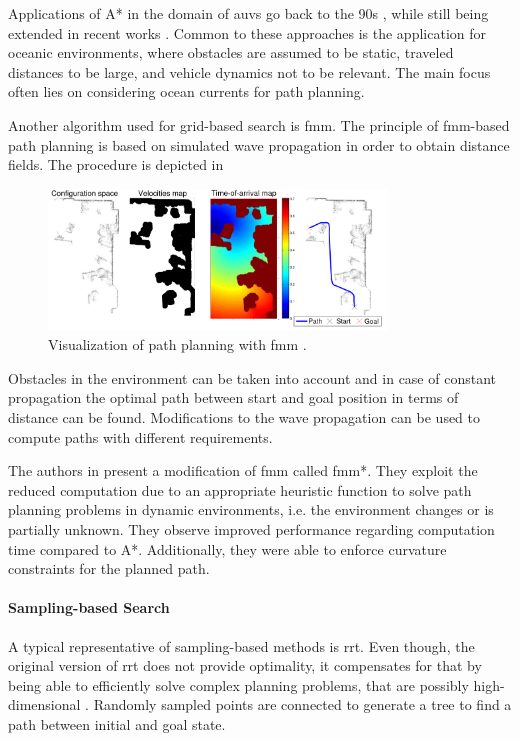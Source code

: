 Applications of A* in the domain of \acp{auv} go back to the 90s \cite{Carroll92}, while still being extended in recent works \cite{zhang20}. Common to these approaches is the application for oceanic environments, where obstacles are assumed to be static, traveled distances to be large, and vehicle dynamics not to be relevant. The main focus often lies on considering ocean currents for path planning.

Another algorithm used for grid-based search is \ac{fmm}. The principle of \acs{fmm}-based path planning is based on simulated wave propagation in order to obtain distance fields. The procedure is depicted in 
\begin{figure}
    \centering
    \includegraphics[width=0.8\textwidth]{images/02/fmm.png}
    \caption{Visualization of path planning with \ac{fmm} \cite{Gomez15}.}
    \label{fig:fmm}
\end{figure}
Obstacles in the environment can be taken into account and in case of constant propagation the optimal path between start and goal position in terms of distance can be found. Modifications to the wave propagation can be used to compute paths with different requirements.

The authors in \cite{Petres09} present a modification of \ac{fmm} called \acs{fmm}*. They exploit the reduced computation due to an appropriate heuristic function to solve path planning problems in dynamic environments, i.e. the environment changes or is partially unknown. They observe improved performance regarding computation time compared to A*. Additionally, they were able to enforce curvature constraints for the planned path.

\paragraph{Sampling-based Search}

A typical representative of sampling-based methods is \ac{rrt}. Even though, the original version of \ac{rrt} does not provide optimality, it compensates for that by being able to efficiently solve complex planning problems, that are possibly high-dimensional \cite{Devaurs16}. Randomly sampled points are connected to generate a tree to find a path between initial and goal state.

